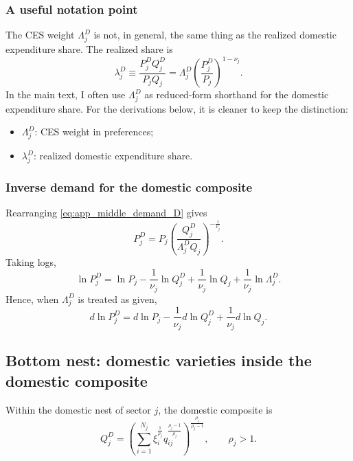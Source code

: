 \subsubsection{A useful notation point}

The CES weight $\Lambda_j^D$ is not, in general, the same thing as the realized domestic expenditure share. The realized share is
\begin{equation}
\lambda_j^D
\equiv
\frac{P_j^D Q_j^D}{P_j Q_j}
=
\Lambda_j^D \left( \frac{P_j^D}{P_j} \right)^{1-\nu_j}.
\label{eq:app_realized_domestic_share}
\end{equation}
In the main text, I often use $\Lambda_j^D$ as reduced-form shorthand for the domestic expenditure share. For the derivations below, it is cleaner to keep the distinction:
\begin{itemize}
    \item $\Lambda_j^D$: CES weight in preferences;
    \item $\lambda_j^D$: realized domestic expenditure share.
\end{itemize}

\subsubsection{Inverse demand for the domestic composite}

Rearranging \eqref{eq:app_middle_demand_D} gives
\begin{equation}
P_j^D
=
P_j
\left( \frac{Q_j^D}{\Lambda_j^D Q_j} \right)^{-\frac{1}{\nu_j}}.
\label{eq:app_middle_inverse_D}
\end{equation}
Taking logs,
\[
\ln P_j^D
=
\ln P_j
- \frac{1}{\nu_j} \ln Q_j^D
+ \frac{1}{\nu_j} \ln Q_j
+ \frac{1}{\nu_j} \ln \Lambda_j^D.
\]
Hence, when $\Lambda_j^D$ is treated as given,
\begin{equation}
d \ln P_j^D
=
d \ln P_j
- \frac{1}{\nu_j} d \ln Q_j^D
+ \frac{1}{\nu_j} d \ln Q_j.
\label{eq:app_middle_inverse_diff}
\end{equation}

\subsection{Bottom nest: domestic varieties inside the domestic composite}

Within the domestic nest of sector $j$, the domestic composite is
\[
Q_j^D =
\left(
\sum_{i=1}^{N_j}
\xi_i^{\frac{1}{\rho_j}} q_{ij}^{\frac{\rho_j-1}{\rho_j}}
\right)^{\frac{\rho_j}{\rho_j-1}},
\qquad \rho_j > 1.
\]

